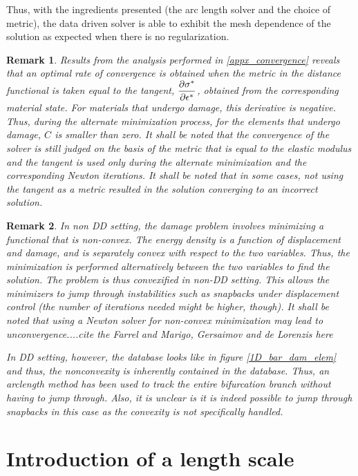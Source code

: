 \documentclass[11pt]{elsarticle}
\newtheorem*{remark}{Remark}
\begin{document}
Thus, with the ingredients presented (the arc length solver and the choice of metric), the data driven solver is able to exhibit the mesh dependence of the solution as expected when there is no regularization.

\begin{remark}
	Results from the analysis performed in \ref{appx_convergence} reveals that an optimal rate of convergence is obtained when the metric in the distance functional is taken equal to the tangent, ${\dfrac{\partial \sigma^*}{\partial \epsilon^*}}$, obtained from the corresponding material state. For materials that undergo damage, this derivative is negative. Thus, during the alternate minimization process, for the elements that undergo damage, $C$ is smaller than zero. It shall be noted that the convergence of the solver is still judged on the basis of the metric that is equal to the elastic modulus and the tangent is used only during the alternate minimization and the corresponding Newton iterations. It shall be noted that in some cases, not using the tangent as a metric resulted in the solution converging to an \textit{incorrect} solution.
\end{remark}

\begin{remark}
	In non DD setting, the damage problem involves minimizing a functional that is non-convex. The energy density is a function of displacement and damage, and is separately convex with respect to the two variables. Thus, the minimization is performed alternatively between the two variables to find the solution. The problem is thus \textit{convexified} in non-DD setting. This allows the minimizers to \textit{jump through} instabilities such as snapbacks under displacement control (the number of iterations needed might be higher, though). It shall be noted that using a Newton solver for non-convex minimization may lead to unconvergence....cite the Farrel and Marigo, Gersaimov and de Lorenzis here
	
	In DD setting, however, the database looks like in figure \ref{1D_bar_dam_elem} and thus, the nonconvexity is inherently contained in the database. Thus, an arclength method has been used to track the entire bifurcation branch without having to jump through. Also, it is unclear is it is indeed possible to jump through snapbacks in this case as the convexity is not specifically handled. 
\end{remark}

\section{Introduction of a length scale}
\end{document}
